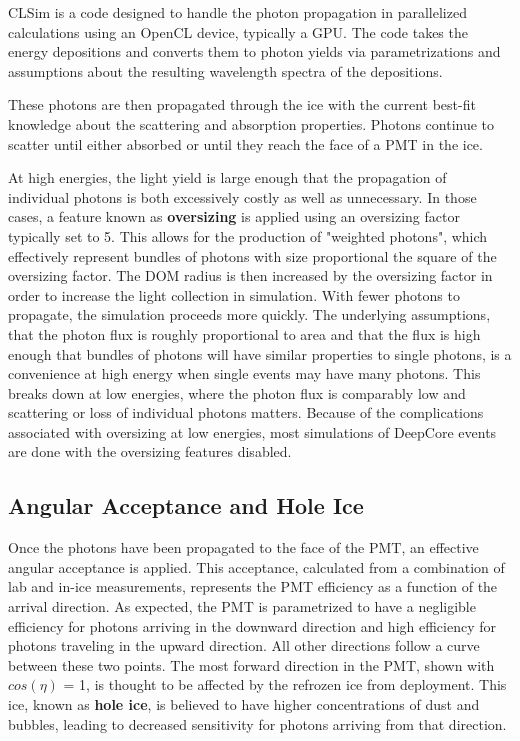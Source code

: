 CLSim is a code designed to handle the photon propagation in parallelized calculations using an OpenCL device, typically a GPU.
The code takes the energy depositions and converts them to photon yields via parametrizations and assumptions about the resulting wavelength spectra of the depositions.

These photons are then propagated through the ice with the current best-fit knowledge about the scattering and absorption properties. 
Photons continue to scatter until either absorbed or until they reach the face of a PMT in the ice.

At high energies, the light yield is large enough that the propagation of individual photons is both excessively costly as well as unnecessary.
In those cases, a feature known as \textbf{oversizing} is applied using an oversizing factor typically set to 5.
This allows for the production of "weighted photons", which effectively represent bundles of photons with size proportional the square of the oversizing factor.
The DOM radius is then increased by the oversizing factor in order to increase the light collection in simulation.
With fewer photons to propagate, the simulation proceeds more quickly. 
The underlying assumptions, that the photon flux is roughly proportional to area and that the flux is high enough that bundles of photons will have similar properties to single photons, is a convenience at high energy when single events may have many photons.
This breaks down at low energies, where the photon flux is comparably low and scattering or loss of individual photons matters.
Because of the complications associated with oversizing at low energies, most simulations of DeepCore events are done with the oversizing features disabled.

\subsection{Angular Acceptance and Hole Ice}
\label{subsec:holeice_sim}
Once the photons have been propagated to the face of the PMT, an effective angular acceptance is applied.
This acceptance, calculated from a combination of lab and in-ice measurements, represents the PMT efficiency as a function of the arrival direction.
As expected, the PMT is parametrized to have a negligible efficiency for photons arriving in the downward direction and high efficiency for photons traveling in the upward direction.
All other directions follow a curve between these two points.
The most forward direction in the PMT, shown with $cos(\eta)$ = 1, is thought to be affected by the refrozen ice from deployment. 
This ice, known as \textbf{hole ice}, is believed to have higher concentrations of dust and bubbles, leading to decreased sensitivity for photons arriving from that direction.

